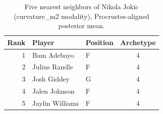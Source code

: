 \begin{table}[htbp]
  \centering\small
  \begin{tabular}{rllc}
    \toprule
    Rank & Player & Position & Archetype \\
    \midrule
    1 & Bam Adebayo & F & 4 \\
    2 & Julius Randle & F & 4 \\
    3 & Josh Giddey & G & 4 \\
    4 & Jalen Johnson & F & 4 \\
    5 & Jaylin Williams & F & 4 \\
    \bottomrule
  \end{tabular}
  \caption{Five nearest neighbors of Nikola Jokic (curvature_m2 modality), Procrustes-aligned posterior mean.}
  \label{tab:Nikola_Jokic_neighbors_curvature_m2}
\end{table}

